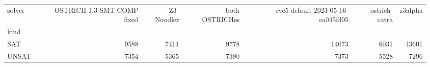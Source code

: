 \begin{tabular}{lrrrrrr}
\toprule
solver & OSTRICH 1.3 SMT-COMP fixed & Z3-Noodler & both OSTRICHes & cvc5-default-2023-05-16-ea045f305 & ostrich-catra & z3alpha \\
kind &  &  &  &  &  &  \\
\midrule
SAT & 9588 & 7411 & 9778 & 14073 & 6031 & 13601 \\
UNSAT & 7354 & 5365 & 7380 & 7373 & 5528 & 7296 \\
\bottomrule
\end{tabular}
